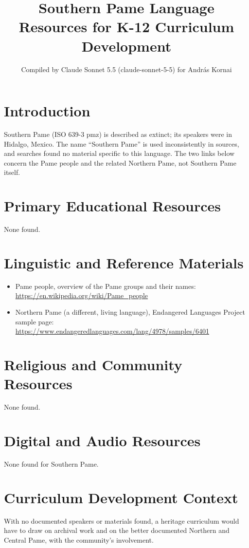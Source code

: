\documentclass[12pt]{article}
\title{Southern Pame Language Resources for K-12 Curriculum Development}
\author{Compiled by Claude Sonnet 5.5 (claude-sonnet-5-5) for Andr\'as Kornai}
\date{}
\begin{document}
\maketitle
\section{Introduction}
Southern Pame (ISO 639-3 pmz) is described as extinct; its speakers were in Hidalgo, Mexico. The name ``Southern Pame'' is used inconsistently in sources, and searches found no material specific to this language. The two links below concern the Pame people and the related Northern Pame, not Southern Pame itself.
\section{Primary Educational Resources}
None found.
\section{Linguistic and Reference Materials}
\begin{itemize}
\item Pame people, overview of the Pame groups and their names: \url{https://en.wikipedia.org/wiki/Pame_people}
\item Northern Pame (a different, living language), Endangered Languages Project sample page: \url{https://www.endangeredlanguages.com/lang/4978/samples/6401}
\end{itemize}
\section{Religious and Community Resources}
None found.
\section{Digital and Audio Resources}
None found for Southern Pame.
\section{Curriculum Development Context}
With no documented speakers or materials found, a heritage curriculum would have to draw on archival work and on the better documented Northern and Central Pame, with the community's involvement.
\end{document}
